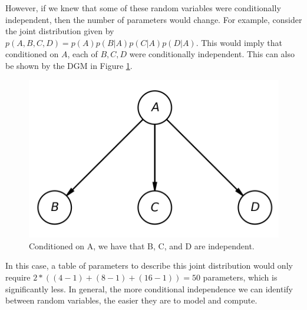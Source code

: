 However, if we knew that some of these random variables were conditionally independent, then the number of parameters would change. For example, consider the joint distribution given by $p(A, B, C, D) = p(A)p(B|A)p(C|A)p(D|A)$. This would imply that conditioned on $A$, each of $B, C, D$ were conditionally independent. This can also be shown by the DGM in Figure \ref{fig:complexity-dgm}.
\begin{figure}
	\centering
	\includegraphics[width=0.3\paperwidth]{../GraphicalModels/fig/complexity-dgm.png}
    \caption{Conditioned on A, we have that B, C, and D are independent.}
	\label{fig:complexity-dgm}
\end{figure}

In this case, a table of parameters to describe this joint distribution would only require $2 * ((4 - 1) + (8 - 1) + (16 - 1))=50$ parameters, which is significantly less. In general, the more conditional independence we can identify between random variables, the easier they are to model and compute. 

